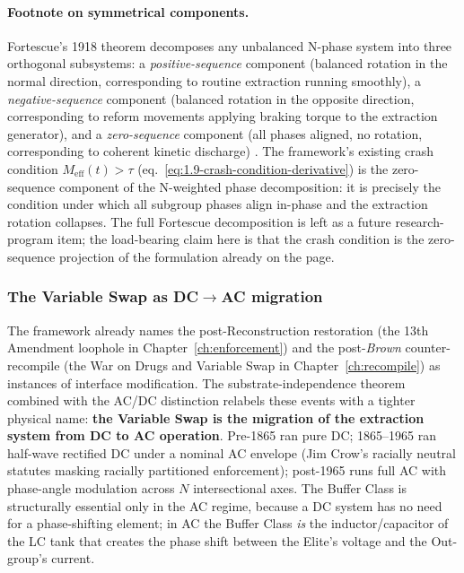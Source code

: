 \paragraph{Footnote on symmetrical components.}
Fortescue's 1918 theorem decomposes any unbalanced N-phase system into
three orthogonal subsystems: a \textit{positive-sequence} component
(balanced rotation in the normal direction, corresponding to routine
extraction running smoothly), a \textit{negative-sequence} component
(balanced rotation in the opposite direction, corresponding to reform
movements applying braking torque to the extraction generator), and a
\textit{zero-sequence} component (all phases aligned, no rotation,
corresponding to coherent kinetic discharge)
\cite{fortescue1918symmetrical}. The framework's existing crash
condition $M_{\text{eff}}(t) > \tau$
(eq.~\ref{eq:1.9-crash-condition-derivative}) is the
zero-sequence component of the N-weighted phase decomposition: it is
precisely the condition under which all subgroup phases align in-phase
and the extraction rotation collapses. The full Fortescue decomposition
is left as a future research-program item; the load-bearing claim here
is that the crash condition is the zero-sequence projection of the
formulation already on the page.

\subsubsection*{The Variable Swap as DC$\to$AC migration}

The framework already names the post-Reconstruction restoration (the
13th Amendment loophole in Chapter~\ref{ch:enforcement}) and the
post-\textit{Brown} counter-recompile (the War on Drugs and Variable
Swap in Chapter~\ref{ch:recompile}) as instances of interface
modification. The
substrate-independence theorem combined with the AC/DC distinction
relabels these events with a tighter physical name: \textbf{the
Variable Swap is the migration of the extraction system from DC to AC
operation}. Pre-1865 ran pure DC; 1865--1965 ran half-wave rectified
DC under a nominal AC envelope (Jim Crow's racially neutral statutes
masking racially partitioned enforcement); post-1965 runs full AC with
phase-angle modulation across $N$ intersectional axes. The Buffer
Class is structurally essential only in the AC regime, because a DC
system has no need for a phase-shifting element; in AC the Buffer
Class \emph{is} the inductor/capacitor of the LC tank that creates the
phase shift between the Elite's voltage and the Out-group's current.

